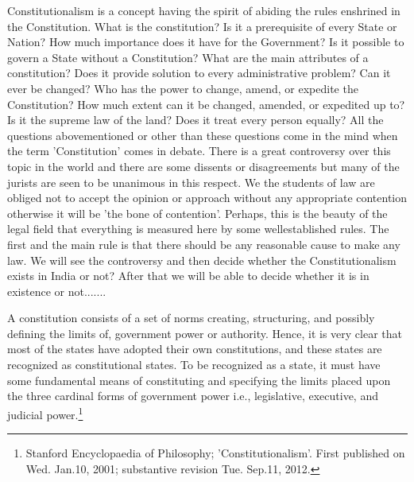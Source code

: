 \setcounter{figure}{0}
\setcounter{table}{0}
\setcounter{footnote}{0}


\begin{multicols}{2}


\noi
Constitutionalism is a concept having the spirit of abiding the rules enshrined in the Constitution.
What is the constitution? Is it a prerequisite of every State or Nation? How much importance does
it have for the Government? Is it possible to govern a State without a Constitution? What are the
main attributes of a constitution? Does it provide solution to every administrative problem? Can
it ever be changed? Who has the power to change, amend, or expedite the Constitution? How
much extent can it be changed, amended, or expedited up to? Is it the supreme law of the land?
Does it treat every person equally? All the questions abovementioned or other than these questions
come in the mind when the term 'Constitution' comes in debate. There is a great controversy over
this topic in the world and there are some dissents or disagreements but many of the jurists are
seen to be unanimous in this respect. We the students of law are obliged not to accept the opinion
or approach without any appropriate contention otherwise it will be 'the bone of contention'.
Perhaps, this is the beauty of the legal field that everything is measured here by some wellestablished rules. The first and the main rule is that there should be any reasonable cause to make
any law. We will see the controversy and then decide whether the Constitutionalism exists in
India or not? After that we will be able to decide whether it is in existence or not.......


\noi
A constitution consists of a set of norms creating, structuring, and possibly defining the limits of,
government power or authority. Hence, it is very clear that most of the states have adopted their
own constitutions, and these states are recognized as constitutional states. To be recognized as a
state, it must have some fundamental means of constituting and specifying the limits placed upon
the three cardinal forms of government power i.e., legislative, executive, and judicial power.\footnote{Stanford Encyclopaedia of Philosophy; 'Constitutionalism'. First published on Wed. Jan.10, 2001; substantive revision Tue. Sep.11, 2012.}


\end{multicols}

